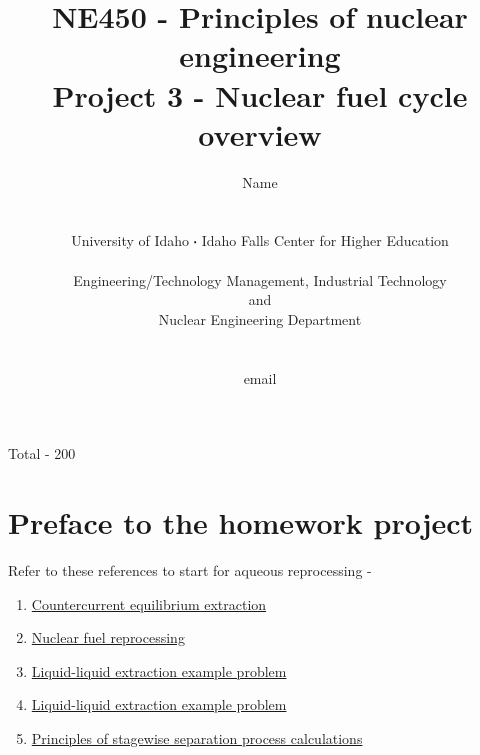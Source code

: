 \documentclass[11pt,a4paper]{article}
\newcommand*\sq{\mathbin{\vcenter{\hbox{\rule{.3ex}{.3ex}}}}} %
\begin{document}
\begin{titlepage}
    \title{
        NE450 - Principles of nuclear engineering\\
        Project 3 - Nuclear fuel cycle overview\\
    }
    \author{
        Name
        \\ \\ \\
        University of Idaho $\sq$ Idaho Falls Center for Higher Education
        \\ \\
        Engineering/Technology Management, Industrial Technology\\and\\Nuclear Engineering Department
        \\ \\ \\
        email 
    }
\clearpage %
\maketitle
\vspace*{\fill}
\begin{flushright}{
        Total - 200
}
\end{flushright}
\thispagestyle{empty} %
\end{titlepage}

\section{Preface to the homework project}

\noindent Refer to these references to start for aqueous reprocessing -
\begin{enumerate}[leftmargin=*,topsep=0pt,font=\bfseries]
    \item\href{../homework-resources/countercurrent-equilibrium-extraction.pdf}{Countercurrent equilibrium extraction}
    \item\href{../homework-resources/nuclear-fuel-reprocessing.pdf}{Nuclear fuel reprocessing}
    \item\href{https://youtu.be/HGwHLaPhw30}{Liquid-liquid extraction example problem}
    \item\href{https://youtu.be/vK8XGYwnZv4}{Liquid-liquid extraction example problem}
    \item\href{../homework-resources/principles-stagewise-separation-process-calculations.pdf}{Principles of stagewise separation process calculations}
\end{enumerate}
\vspace{\baselineskip}
\end{document}
